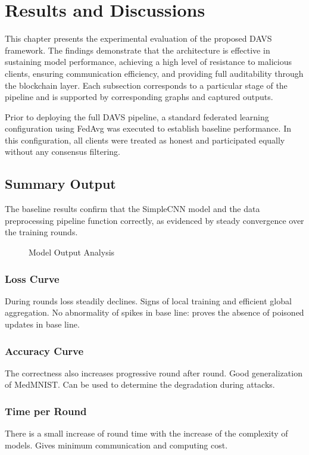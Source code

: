 \documentclass[12pt,a4paper]{article}
\begin{document}
\section{Results and Discussions}
This chapter presents the experimental evaluation of the proposed DAVS framework. The findings demonstrate that the architecture is effective in sustaining model performance, achieving a high level of resistance to malicious clients, ensuring communication efficiency, and providing full auditability through the blockchain layer. Each subsection corresponds to a particular stage of the pipeline and is supported by corresponding graphs and captured outputs.

Prior to deploying the full DAVS pipeline, a standard federated learning configuration using FedAvg was executed to establish baseline performance. In this configuration, all clients were treated as honest and participated equally without any consensus filtering.

\subsection{Summary Output}
The baseline results confirm that the SimpleCNN model and the data preprocessing pipeline function correctly, as evidenced by steady convergence over the training rounds.

\begin{figure}[h]
    \centering
    \fbox{\rule{0pt}{2in} \rule{0.9\linewidth}{0pt}}
    \caption{Model Output Analysis}
\end{figure}

\subsubsection{Loss Curve}
During rounds loss steadily declines. Signs of local training and efficient global aggregation. No abnormality of spikes in base line: proves the absence of poisoned updates in base line.

\subsubsection{Accuracy Curve}
The correctness also increases progressive round after round. Good generalization of MedMNIST. Can be used to determine the degradation during attacks.

\subsubsection{Time per Round}
There is a small increase of round time with the increase of the complexity of models. Gives minimum communication and computing cost.
\end{document}
